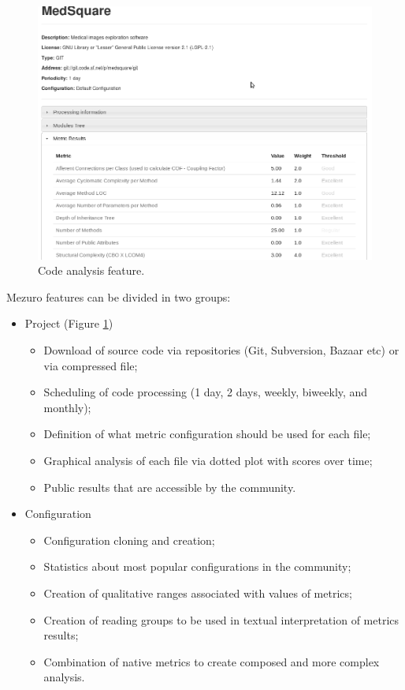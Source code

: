 \documentclass{llncs}
\begin{document}
\begin{figure}[hbt]
  \centering
    \includegraphics[width=.9\linewidth]{images/new-repository-results.png}
  \caption{Code analysis feature.}
  \label{fig:feature-1}
\end{figure}

Mezuro features can be divided in two groups:

\begin{itemize}
    \item Project (Figure \ref{fig:feature-1})

    \begin{itemize}
        \item Download of source code via repositories (Git, Subversion, Bazaar etc) or via compressed file;
        \item Scheduling of code processing (1 day, 2 days, weekly, biweekly, and monthly);
        \item Definition of what metric configuration should be used for each file;
        \item Graphical analysis of each file via dotted plot with scores over time;
        \item Public results that are accessible by the community.
    \end{itemize}
    \item Configuration
    \begin{itemize}
        \item Configuration cloning and creation;
        \item Statistics about most popular configurations in the community;
        \item Creation of qualitative ranges associated with values of metrics;
        \item Creation of reading groups to be used in textual interpretation of metrics results;
        \item Combination of native metrics to create composed and more complex analysis.
    \end{itemize}
\end{itemize}
\end{document}
